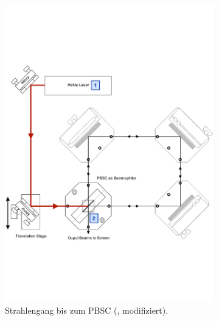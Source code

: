 \begin{figure}[!ht]
\begin{subfigure}[c]{0.50\textwidth}
    \includegraphics[width=\textwidth]{content/images/interferometer_1.pdf}
    \caption{Strahlengang bis zum PBSC (\cite{teachspin}, modifiziert).}
	\label{fig:int_pbsc}
\end{subfigure}
\hspace*{\fill}
\begin{subfigure}[c]{0.50\textwidth}

\end{subfigure}
\end{figure}
